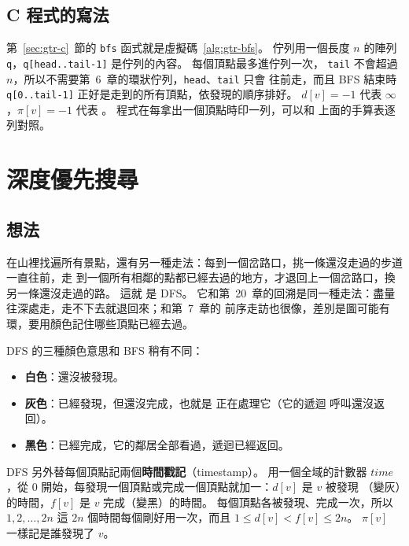 \subsection{C 程式的寫法}

第~\ref{sec:gtr-c}~節的 \texttt{bfs} 函式就是虛擬碼~\ref{alg:gtr-bfs}。 佇列用一個長度 $n$
的陣列 \texttt{q}，\texttt{q[head..tail-1]} 是佇列的內容。 每個頂點最多進佇列一次，
\texttt{tail} 不會超過 $n$，所以不需要第~6~章的環狀佇列，\texttt{head}、\texttt{tail} 只會
往前走，而且 BFS 結束時 \texttt{q[0..tail-1]} 正好是走到的所有頂點，依發現的順序排好。
$d[v] = -1$ 代表 $\infty$，$\pi[v] = -1$ 代表 \NIL。 程式在每拿出一個頂點時印一列，可以和
上面的手算表逐列對照。

\section{深度優先搜尋}
\label{sec:gtr-dfs}

\subsection{想法}

在山裡找遍所有景點，還有另一種走法：每到一個岔路口，挑一條還沒走過的步道一直往前，走
到一個所有相鄰的點都已經去過的地方，才退回上一個岔路口，換另一條還沒走過的路。 這就
是 DFS。 它和第~20~章的回溯是同一種走法：盡量往深處走，走不下去就退回來；和第~7~章的
前序走訪也很像，差別是圖可能有環，要用顏色記住哪些頂點已經去過。

DFS 的三種顏色意思和 BFS 稍有不同：

\begin{itemize}
\item \textbf{白色}：還沒被發現。
\item \textbf{灰色}：已經發現，但還沒完成，也就是  正在處理它（它的遞迴
呼叫還沒返回）。
\item \textbf{黑色}：已經完成，它的鄰居全部看過，遞迴已經返回。
\end{itemize}

DFS 另外替每個頂點記兩個\textbf{時間戳記}（timestamp）。 用一個全域的計數器
$\mathit{time}$，從 $0$ 開始，每發現一個頂點或完成一個頂點就加一：$d[v]$ 是 $v$ 被發現
（變灰）的時間，$f[v]$ 是 $v$ 完成（變黑）的時間。 每個頂點各被發現、完成一次，所以
$1, 2, \ldots, 2n$ 這 $2n$ 個時間每個剛好用一次，而且 $1 \le d[v] < f[v] \le 2n$。 $\pi[v]$
一樣記是誰發現了 $v$。

